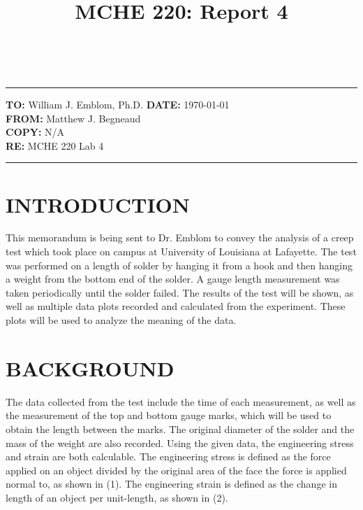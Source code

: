 \documentclass[12pt]{article}
\title{MCHE 220: Report 4}
\begin{document}
\fancyhf{}  
  \renewcommand{\headrulewidth}{0pt}
    \pagestyle{plain}
    
\captionsetup[table]{labelsep=space}

\begin{flushleft}
\hrulefill\\\hrule height 1pt
\vspace{5pt}
\textbf{TO: }William J. Emblom, Ph.D.  \hfill   \textbf{DATE: }\today                
\bigskip\\
\textbf{FROM: }Matthew J. Begneaud
\bigskip\\
\textbf{COPY: }N/A
\bigskip\\
\textbf{RE: }MCHE 220 Lab 4
\vspace{-10pt}
\end{flushleft}
\hrulefill \hrule height 1pt


\section*{\fontsize{12}{12}\selectfont INTRODUCTION}
This memorandum is being sent to Dr. Emblom to convey the analysis of a creep test which took place on campus at University of Louisiana at Lafayette. The test was performed on a length of solder by hanging it from a hook and then hanging a weight from the bottom end of the solder. A gauge length measurement was taken periodically until the solder failed. The results of the test will be shown, as well as multiple data plots recorded and calculated from the experiment. These plots will be used to analyze the meaning of the data.
\bigskip



\section*{\fontsize{12}{12}\selectfont BACKGROUND}
The data collected from the test include the time of each measurement, as well as the measurement of the top and bottom gauge marks, which will be used to obtain the length between the marks. The original diameter of the solder and the mass of the weight are also recorded. Using the given data, the engineering stress and strain are both calculable. The engineering stress is defined as the force applied on an object divided by the original area of the face the force is applied normal to, as shown in (1). The engineering strain is defined as the change in length of an object per unit-length, as shown in (2).
\end{document}
